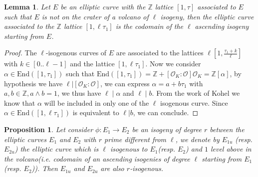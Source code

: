 \documentclass{lms}
\newtheorem{lem}[thm]{Lemma}
\newtheorem{prop}[thm]{Proposition}
\begin{document}
\begin{lem} 
Let $E$ be an elliptic curve with the $\mathbb{Z} $ lattice $[1,\tau ]$ associated to $E$ such that $E$ is not on the crater of a volcano of $\ell$ isogeny, then the elliptic curve associated to the $\mathbb{Z}$ lattice $ [ 1, \ell \tau_1 ] $ is the codomain of the $\ell$ ascending isogeny starting from $E$. 
\end{lem}

\begin{proof}
The $\ell$-isogenous curves of $E$ are associated to the lattices $\ell[1,\frac{\tau_1+k}{\ell}]$ with $k \in [0..\ell-1]$ and the lattice $[1,\ell \tau_1]$. Now we consider $\alpha \in \mathrm{End}([1,\tau_1])$ such that $\mathrm{End}([1,\tau_1])= \mathbb{Z} + [\mathcal{O}_K:\mathcal{O}]\mathcal{O}_K=\mathbb{Z}[\alpha]$, by hypothesis we have $\ell | [\mathcal{O}_K:\mathcal{O}]$, we can express $\alpha = a + b \tau_1$ with $a,b \in \mathbb{Z}, a \wedge b =1$, we thus have $\ell \mid \alpha$ and $\ell \mid b$. From the work of Kohel \cite{Kohel} we know that $\alpha$ will be included in only one of the $\ell$ isogenous curve. Since $\alpha \in \mathrm{End}([1,\ell\tau_1]) $ is equivalent to $\ell | b$, we can conclude.
\end{proof}

\begin{prop}
Let consider $\phi : E_1 \rightarrow E_2$ be an isogeny of degree $r$ between the elliptic curves $E_1$ and $E_2$ with $r$ prime different from $\ell$, we denote by $E_{1u}$ (resp. $E_{2u}$) the elliptic curve which is $\ell$ isogenous to $E_1$(resp. $E_2$) and $1$ level above in the volcano(i.e. codomain of an ascending isogenies of degree $\ell$ starting from $E_1$ (resp. $E_2$)). Then $E_{1u}$ and $E_{2u}$ are also $r$-isogenous.
\end{prop}
\end{document}
